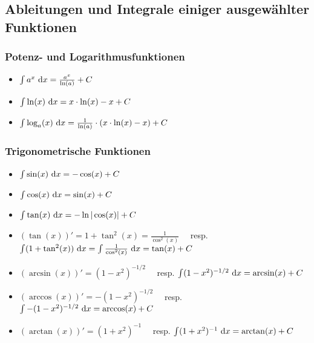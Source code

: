 \subsection{Ableitungen und Integrale einiger ausgewählter Funktionen}\label{subsec:ableitungen-und-integrale-funktionen}

\subsubsection*{Potenz- und Logarithmusfunktionen}

\begin{itemize}
    \item $\int a^x \ \mathrm{d} x = \frac{a^x}{\ln(a)} + C$
    \item $\int \ln(x) \ \mathrm{d} x = x \cdot \ln(x) - x + C$
    \item $\int \log_a(x) \ \mathrm{d} x = \frac{1}{\ln(a)} \cdot (x \cdot \ln(x) - x) + C$
\end{itemize}

\subsubsection{Trigonometrische Funktionen}

\begin{itemize}
    \item $\int \sin(x) \ \mathrm{d} x = -\cos(x) + C$
    \item $\int \cos(x) \ \mathrm{d} x = \sin(x) + C$
    \item $\int \tan(x) \ \mathrm{d} x = -\ln |\cos(x)| + C$
    \item $(\tan(x))' = 1 + \tan^2(x) = \frac{1}{\cos^2(x)} \quad$ resp. $\int (1 + \tan^2(x)) \ \mathrm{d} x = \int \frac{1}{\cos^2(x)} \ \mathrm{d} x = \tan(x) + C$
    \item $(\arcsin(x))' = (1 - x^2)^{-1/2} \quad$ resp. $\int (1 - x^2)^{-1/2} \ \mathrm{d} x = \arcsin(x) + C$
    \item $(\arccos(x))' = -(1 - x^2)^{-1/2} \quad$ resp. $\int -(1 - x^2)^{-1/2} \ \mathrm{d} x = \arccos(x) + C$
    \item $(\arctan(x))' = (1 + x^2)^{-1} \quad$ resp. $\int (1 + x^2)^{-1} \ \mathrm{d} x = \arctan(x) + C$
\end{itemize}